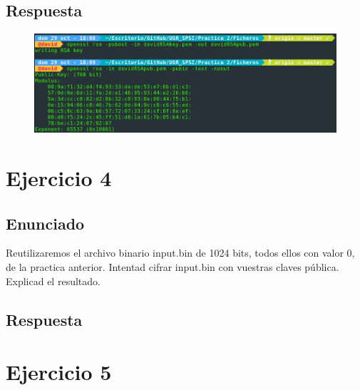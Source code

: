 \documentclass[10pt,a4paper,spanish]{report}
\begin{document}
\section{Respuesta}
\noindent

\begin{figure}[!hbp]
 \centering  \includegraphics[width=1\textwidth]{./Imagenes/4.png}
\end{figure}


\chapter{Ejercicio 4}

\section{Enunciado}
\noindent
Reutilizaremos el archivo binario input.bin de 1024 bits, todos ellos con valor 0, de la practica anterior. Intentad cifrar input.bin con vuestras claves pública. Explicad el resultado.

\section{Respuesta}
\noindent

\chapter{Ejercicio 5}
\end{document}
